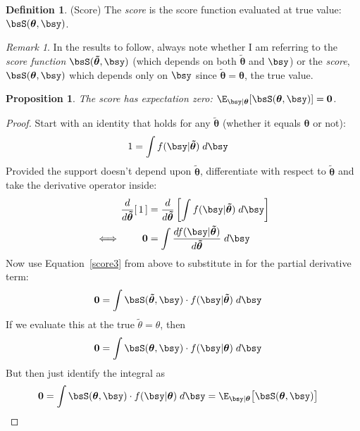 \documentclass[12pt]{article}
\theoremstyle{plain}
\newtheorem{prop}[thm]{Proposition}
\theoremstyle{definition}
\newtheorem{defn}[thm]{Definition}
\theoremstyle{remark}
\newtheorem*{rmk}{Remark}
\newcommand{\bstheta}{\boldsymbol{\theta}}
\newcommand{\bstildetheta}{\boldsymbol{\tilde{\theta}}}
\renewcommand{\bso}{\boldsymbol{0}}
\begin{document}
\begin{defn}(Score)
The \emph{score} is the score function evaluated at true value:
$\bsS(\bstheta,\bsy)$.
\end{defn}
\begin{rmk}
In the results to follow, always note whether I am referring to the
\emph{score function} $\bsS(\bstildetheta,\bsy)$ (which depends on both
$\bstildetheta$ and $\bsy$) or the \emph{score}, $\bsS(\bstheta,\bsy)$
which depends only on $\bsy$ since $\bstildetheta=\bstheta$, the true
value.
\end{rmk}

\begin{prop}
The score has expectation zero:
$\E_{\bsy|\bstheta}[\bsS(\bstheta,\bsy)]=\bso$.
\end{prop}
\begin{proof}
Start with an identity that holds for any $\bstildetheta$ (whether it
equals $\bstheta$ or not):
\begin{align*}
  1 &= \int f(\bsy|\bstildetheta) \; d\bsy
\end{align*}
Provided the support doesn't depend upon $\bstildetheta$, differentiate
with respect to $\bstildetheta$ and take the derivative operator inside:
\begin{align*}
  \frac{d}{d\bstildetheta}
  [\, 1 \,]
  &=
  \frac{d}{d\bstildetheta}
  \left[
    \int f(\bsy|\bstildetheta) \; d\bsy
  \right] \\
  \iff\qquad
  \bso
  &=
  \int \frac{df(\bsy|\bstildetheta)}{d\bstildetheta}  \; d\bsy
\end{align*}
Now use Equation~\ref{score3} from above to substitute in for the
partial derivative term:
\begin{align}
  \bso &= \int \bsS(\bstildetheta,\bsy)\cdot f(\bsy|\bstildetheta)
  \; d\bsy
  \label{trueonly}
\end{align}
If we evaluate this at the true $\tilde{\theta}=\theta$, then
\begin{align*}
  \bso &= \int \bsS(\bstheta,\bsy)\cdot f(\bsy|\bstheta) \; d\bsy
\end{align*}
But then just identify the integral as
\begin{align*}
  \bso &= \int \bsS(\bstheta,\bsy)\cdot f(\bsy|\bstheta) \; d\bsy
  = \E_{\bsy|\bstheta}\big[\bsS(\bstheta,\bsy)\big]
\end{align*}
\end{proof}
\end{document}
